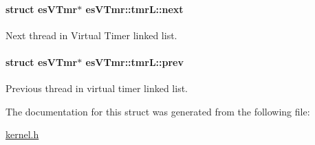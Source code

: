 \hypertarget{structesVTmr_1_1tmrL_a5395eb5d6e77ea662b0f6e5cae542f64}{
\paragraph[{next}]{\setlength{\rightskip}{0pt plus 5cm}struct {\bf es\-V\-Tmr}$\ast$ es\-V\-Tmr\-::tmr\-L\-::next}}\label{structesVTmr_1_1tmrL_a5395eb5d6e77ea662b0f6e5cae542f64}


Next thread in Virtual Timer linked list. 

\hypertarget{structesVTmr_1_1tmrL_aa5afd2bcc0767e15743ec611b9f9dfd1}{
\paragraph[{prev}]{\setlength{\rightskip}{0pt plus 5cm}struct {\bf es\-V\-Tmr}$\ast$ es\-V\-Tmr\-::tmr\-L\-::prev}}\label{structesVTmr_1_1tmrL_aa5afd2bcc0767e15743ec611b9f9dfd1}


Previous thread in virtual timer linked list. 



The documentation for this struct was generated from the following file\-:\begin{DoxyCompactItemize}
\item 
\hyperlink{kernel_8h}{kernel.\-h}\end{DoxyCompactItemize}
